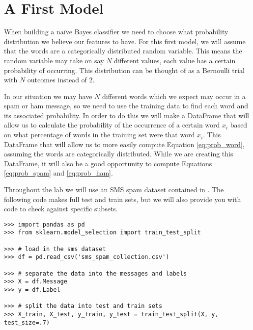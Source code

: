 
\section*{A First Model}
When building a naïve Bayes classifier we need to choose what probability distribution we believe our features to have.
For this first model, we will assume that the words are a categorically distributed random variable.
This means the random variable may take on say $N$ different values, each value has a certain probability of occurring.
This distribution can be thought of as a Bernoulli trial with $N$ outcomes instead of 2.

In our situation we may have $N$ different words which we expect may occur in a spam or ham message, so we need to use the training data to find each word and its associated probability.
In order to do this we will make a DataFrame that will allow us to calculate the probability of the occurrence of a certain word $x_i$ based on what percentage of words in the training set were that word $x_i$.
This DataFrame that will allow us to more easily compute Equation \ref{eq:prob_word}, assuming the words are categorically distributed.
While we are creating this DataFrame, it will also be a good opportunity to compute Equations \ref{eq:prob_spam} and \ref{eq:prob_ham}.

Throughout the lab we will use an SMS spam dataset contained in .
The following code makes full test and train sets, but we will also provide you with code to check against specific subsets.

\begin{lstlisting}
>>> import pandas as pd
>>> from sklearn.model_selection import train_test_split

>>> # load in the sms dataset
>>> df = pd.read_csv('sms_spam_collection.csv')

>>> # separate the data into the messages and labels
>>> X = df.Message
>>> y = df.Label

>>> # split the data into test and train sets
>>> X_train, X_test, y_train, y_test = train_test_split(X, y, test_size=.7)
\end{lstlisting}


